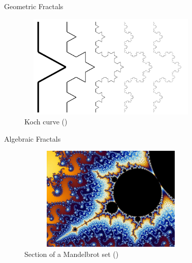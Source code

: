 	\begin{frame}{Geometric Fractals}
		\begin{figure}
		\centering
			\includegraphics[width = 9cm, height = 5cm  ]{images/Koch1.png}
			\caption{Koch curve \space
			(\cite{frac})}
			\label{koch}
		\end{figure}
		\end{frame}
		\begin{frame}{Algebraic Fractals}
		\begin{figure}
			\centering
			\includegraphics[width = 9cm, height = 5cm  ]{images/mandelbrot.jpg}
			\caption{Section of a Mandelbrot set \space
			(\cite{wiki:xxx})}
			\label{mandel}
		\end{figure}
		\end{frame}



